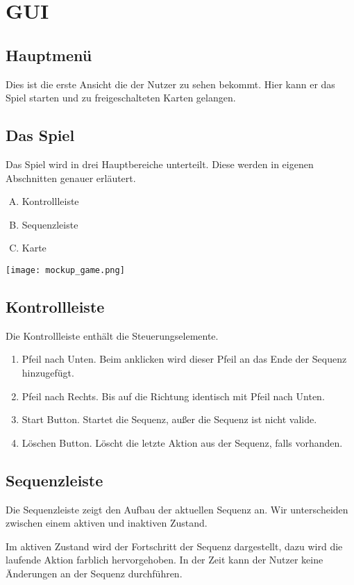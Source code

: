 \section{GUI}
\subsection{Hauptmenü}
Dies ist die erste Ansicht die der Nutzer zu sehen bekommt. Hier kann er das
Spiel starten und zu freigeschalteten Karten gelangen.

\subsection{Das Spiel}

Das Spiel wird in drei Hauptbereiche unterteilt. Diese werden in eigenen
Abschnitten genauer erläutert. 
\begin{enumerate}[A.]
  \item Kontrollleiste
  \item Sequenzleiste
  \item Karte
\end{enumerate}
\texttt{[image: mockup\_game.png]}


\subsection{Kontrollleiste}
Die Kontrollleiste enthält die Steuerungselemente.
\begin{enumerate}
  \item Pfeil nach Unten. Beim anklicken wird dieser Pfeil an das Ende der
        Sequenz hinzugefügt.
  \item Pfeil nach Rechts. Bis auf die Richtung identisch mit Pfeil nach Unten.
  \item Start Button. Startet die Sequenz, außer die Sequenz ist nicht valide.
  \item Löschen Button. Löscht die letzte Aktion aus der Sequenz, falls vorhanden.
\end{enumerate}

\subsection{Sequenzleiste}
Die Sequenzleiste zeigt den Aufbau der aktuellen Sequenz an. Wir unterscheiden
zwischen einem aktiven und inaktiven Zustand.

Im aktiven Zustand wird der Fortschritt der Sequenz dargestellt, dazu wird die
laufende Aktion farblich hervorgehoben. In der Zeit kann der Nutzer keine
Änderungen an der Sequenz durchführen.

